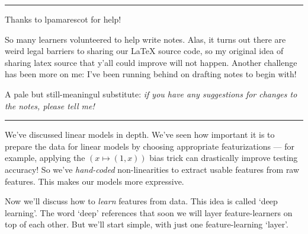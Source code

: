 
\hrule
  Thanks to \textsf{\blu lpamarescot} for help!
  \par
  So many learners volunteered to help write notes.  Alas, it turns out there
    are weird legal barriers to sharing our LaTeX source code, so my original
    idea of sharing latex source that y'all could improve will not happen.
    Another challenge has been more on me: I've been running behind on drafting
    notes to begin with!
  \par
  A pale but still-meaningul substitute: \emph{if you have any suggestions for
    changes to the notes, please tell me!}
\hrule


%
%
%
%




We've discussed linear models in depth.  We've seen how important it is to
prepare the data for linear models by choosing appropriate featurizations ---
for example, applying the $(x \mapsto (1, x))$ bias trick can drastically
improve testing accuracy!
%
So we've \emph{hand-coded} non-linearities to extract usable features from raw
features.  This makes our models more expressive.

Now we'll discuss how to \emph{learn} features from data.  This idea is called `deep
learning'.  The word `deep' references that soon we will layer feature-learners
on top of each other.  But we'll start simple, with just one feature-learning
`layer'.

